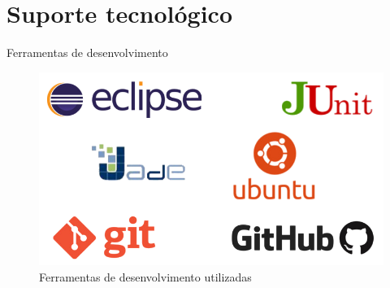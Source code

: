 \section{Suporte tecnológico}

\begin{frame}{Ferramentas de desenvolvimento}

  \begin{figure}[t]
    \centering
    \includegraphics[height=\dimexpr9\textheight/14\relax]{figuras/ferramentas}
    \caption{Ferramentas de desenvolvimento utilizadas}
  \end{figure}
  
\end{frame}



